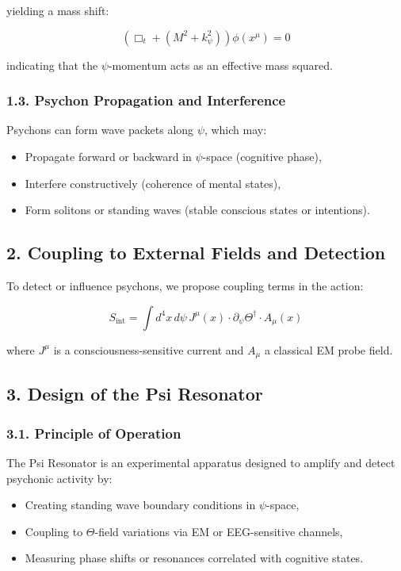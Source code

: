 yielding a mass shift:

\[
\left( \Box_t + (M^2 + k_\psi^2) \right) \phi(x^\mu) = 0
\]

indicating that the \(\psi\)-momentum acts as an effective mass squared.

\subsubsection*{1.3. Psychon Propagation and Interference}

Psychons can form wave packets along \(\psi\), which may:
\begin{itemize}
  \item Propagate forward or backward in \(\psi\)-space (cognitive phase),
  \item Interfere constructively (coherence of mental states),
  \item Form solitons or standing waves (stable conscious states or intentions).
\end{itemize}

\subsection*{2. Coupling to External Fields and Detection}

To detect or influence psychons, we propose coupling terms in the action:

\[
S_{\text{int}} = \int d^4x \, d\psi \, J^\mu(x) \cdot \partial_\psi \Theta^\dagger \cdot A_\mu(x)
\]

where \(J^\mu\) is a consciousness-sensitive current and \(A_\mu\) a classical EM probe field.

\subsection*{3. Design of the Psi Resonator}

\subsubsection*{3.1. Principle of Operation}

The Psi Resonator is an experimental apparatus designed to amplify and detect psychonic activity by:

\begin{itemize}
  \item Creating standing wave boundary conditions in \(\psi\)-space,
  \item Coupling to \(\Theta\)-field variations via EM or EEG-sensitive channels,
  \item Measuring phase shifts or resonances correlated with cognitive states.
\end{itemize}

